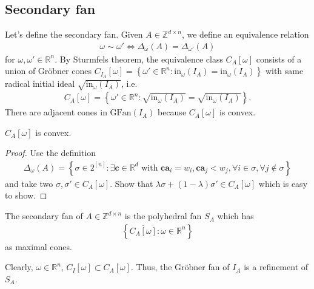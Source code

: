 \documentclass[a4paper, 11pt]{article}
\begin{document}
\subsection{Secondary fan}

Let's define the secondary fan. Given \( A \in \mathbb Z^{d \times n} \), we define an equivalence relation 
\begin{align*}
  \omega \sim \omega ' \iff \Delta_\omega(A) = \Delta_{\omega'}(A)
\end{align*}
for \( \omega, \omega' \in \mathbb R^n \). By Sturmfels theorem, the equivalence class \( C_A[\omega]  \) consists of a union of Gröbner cones \( C_{I_A}[\omega] = \left\{ \omega ' \in \mathbb R^n : \mathrm{in}_\omega(I_A) = \mathrm{in}_\omega(I_A) \right\} \) with same radical initial ideal \( \sqrt{\mathrm{in}_\omega(I_A)} \), i.e.
\begin{align*}
  C_A[\omega] = \left\{ \omega ' \in \mathbb R^n : \sqrt{\mathrm{in}_\omega(I_A)} = \sqrt{\mathrm{in}_\omega(I_A)}  \right\}.
\end{align*}
There are adjacent cones in \( \mathrm{GFan}(I_A) \) because \( C_A[\omega] \) is convex.

\begin{prop}
  \( C_A[\omega] \) is convex.
\end{prop}

\begin{proof}
  Use the definition 
  \begin{align*}
    \Delta_\omega(A)  = \left\{ \sigma \in 2^{[n]} : \exists \mathbf  c \in \mathbb R^d \text{ with } \mathbf c \mathbf a_i = w_i, \mathbf c \mathbf a_j < w_j, \forall i \in \sigma, \forall j \notin \sigma \right\}
  \end{align*}
  and take two \( \sigma, \sigma' \in C_A[\omega] \). Show that \( \lambda\sigma + (1-\lambda) \sigma' \in C_A[\omega]\) which is easy to show.
\end{proof}

\begin{defi}
  The secondary fan of \( A \in \mathbb Z^{d \times n} \) is the polyhedral fan \( S_A \) which has 
  \begin{align*}
    \left\{ \overline{C_A[\omega]} : \omega \in \mathbb R^n \right\} 
  \end{align*} as maximal cones.
\end{defi}

\begin{remark}
  Clearly, \( \omega \in \mathbb R^n \), \( C_I[\omega] \subset C_A[\omega
  ] \). Thus, the Gröbner fan of \( I_A \) is a refinement of \( S_A \).
\end{remark}
\end{document}
